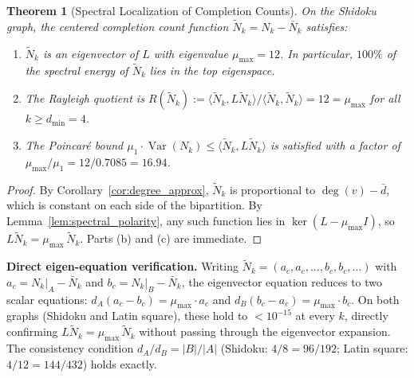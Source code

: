 \documentclass[11pt]{article}
\newtheorem{theorem}{Theorem}[section]
\theoremstyle{definition}
\theoremstyle{remark}
\begin{document}
\begin{theorem}[Spectral Localization of Completion Counts]\label{thm:spectral_loc}
On the Shidoku graph, the centered completion count function $\tilde{N}_k = N_k - \bar{N}_k$ satisfies:
\begin{enumerate}[nosep, label=(\alph*)]
\item $\tilde{N}_k$ is an eigenvector of $L$ with eigenvalue $\mu_{\max} = 12$. In particular, $100\%$ of the spectral energy of $\tilde{N}_k$ lies in the top eigenspace.
\item The Rayleigh quotient is $R(\tilde{N}_k) := \langle \tilde{N}_k, L\tilde{N}_k\rangle / \langle \tilde{N}_k, \tilde{N}_k\rangle = 12 = \mu_{\max}$ for all $k \ge d_{\min} = 4$.
\item The Poincar\'{e} bound $\mu_1 \cdot \operatorname{Var}(N_k) \le \langle \tilde{N}_k, L\tilde{N}_k\rangle$ is satisfied with a factor of $\mu_{\max}/\mu_1 = 12/0.7085 = 16.94$.
\end{enumerate}
\end{theorem}

\begin{proof}
By Corollary~\ref{cor:degree_approx}, $\tilde{N}_k$ is proportional to $\deg(v) - \bar{d}$, which is constant on each side of the bipartition. By Lemma~\ref{lem:spectral_polarity}, any such function lies in $\ker(L - \mu_{\max} I)$, so $L\tilde{N}_k = \mu_{\max}\,\tilde{N}_k$. Parts (b) and (c) are immediate.
\end{proof}

\textbf{Direct eigen-equation verification.} Writing $\tilde{N}_k = (a_c, a_c, \ldots, b_c, b_c, \ldots)$ with $a_c = N_k|_A - \bar{N}_k$ and $b_c = N_k|_B - \bar{N}_k$, the eigenvector equation reduces to two scalar equations: $d_A(a_c - b_c) = \mu_{\max} \cdot a_c$ and $d_B(b_c - a_c) = \mu_{\max} \cdot b_c$.  On both graphs (Shidoku and Latin square), these hold to $< 10^{-15}$ at every $k$, directly confirming $L \tilde{N}_k = \mu_{\max}\,\tilde{N}_k$ without passing through the eigenvector expansion. The consistency condition $d_A/d_B = |B|/|A|$ (Shidoku: $4/8 = 96/192$; Latin square: $4/12 = 144/432$) holds exactly.
\end{document}
